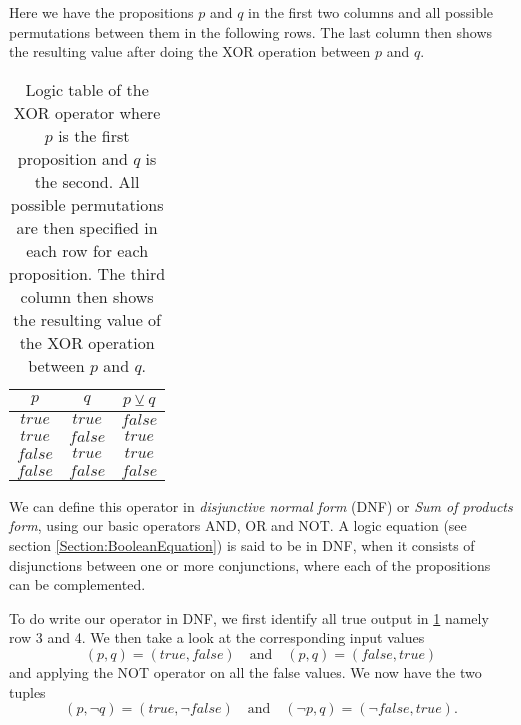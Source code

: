                 Here we have the propositions $p$ and $q$ in the first two columns and all possible permutations between them in the following rows. The last column then shows the resulting value after doing the XOR operation between $p$ and $q$.
                
                \begin{table}[h!]
                    \centering
                    \begin{tabular}{|c|c|c|}
                    	\hline
                    	  $p$   &   $q$   & $p \veebar q$ \\ \hline
                    	$true$  & $true$  &    $false$    \\ \hline
                    	$true$  & $false$ &    $true$     \\ \hline
                    	$false$ & $true$  &    $true$     \\ \hline
                    	$false$ & $false$ &    $false$    \\ \hline
                    \end{tabular}
                    \caption{Logic table of the XOR operator where $p$ is the first proposition and $q$ is the second. All possible permutations are then specified in each row for each proposition. The third column then shows the resulting value of the XOR operation between $p$ and $q$.}
                    \label{LogicTable:XOR}
                \end{table}
            
                We can define this operator in \textit{disjunctive normal form} (DNF) or \textit{Sum of products form}, using our basic operators AND, OR and NOT. A logic equation (see section \ref{Section:BooleanEquation}) is said to be in DNF, when it consists of disjunctions between one or more conjunctions, where each of the propositions can be complemented.
                
                To do write our operator in DNF, we first identify all true output in \ref{LogicTable:XOR} namely row 3 and 4. We then take a look at the corresponding input values
                \begin{equation}
                    (p,q) = (true, false) \quad \text{and} \quad (p,q) = (false, true)
                \end{equation}
                and applying the NOT operator on all the false values. We now have the two tuples
                \begin{equation}
                    (p,\neg q) = (true, \neg false) \quad \text{and} \quad (\neg p, q) = (\neg false, true).
                \end{equation}
                
